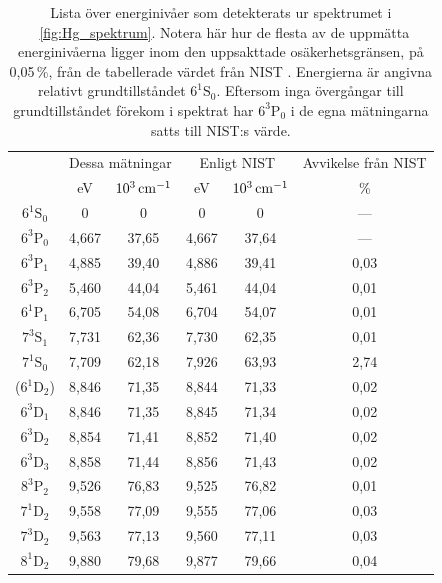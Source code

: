 \documentclass[11pt,a4paper]{article}
\newcommand{\figref}{\figurename~\ref}
\begin{document}
\begin{table}
\centering
\caption{Lista över energinivåer som detekterats ur spektrumet i
  \figref{fig:Hg_spektrum}. Notera här hur de flesta av de uppmätta
  energinivåerna ligger inom den uppsakttade osäkerhetsgränsen, på
  0,05\,\%, från de tabellerade värdet från NIST
  \cite{NIST_levels}. Energierna är angivna relativt grundtillståndet
  $6^1\mathrm{S}_0$. Eftersom inga övergångar till grundtillståndet
  förekom i spektrat har $6^3\mathrm{P}_0$ i de egna mätningarna satts
  till NIST:s värde. } 
\label{tab:Hg_nivaer}
\begin{tabular}{|c||c|c|c|c|c|}\cline{2-6}
\multicolumn{1}{c|}{} &
\multicolumn{2}{|c|}{Dessa mätningar} & 
\multicolumn{2}{|c|}{Enligt NIST\cite{NIST_levels}} 
& Avvikelse från NIST
\\ \cline{2-6}
\multicolumn{1}{c|}{} &
\unit{eV} 
& $\unit[10^3]{cm^{-1}}$ &\unit{eV} 
& $\unit[10^3]{cm^{-1}}$
& \%
\\ \hline
$6^1\mathrm{S}_0$ &0 & 0 & 0 & 0 & ---
\\ \hline
$6^3\mathrm{P}_0$ &4,667 & 37,65 & 4,667 & 37,64 & --- \\ \hline 
$6^3\mathrm{P}_1$ &4,885 & 39,40 & 4,886 & 39,41 & 0,03 \\ \hline 
$6^3\mathrm{P}_2$ &5,460 & 44,04 & 5,461 & 44,04 & 0,01 \\ \hline 
$6^1\mathrm{P}_1$ &6,705 & 54,08 & 6,704 & 54,07 & 0,01 \\ \hline 
$7^3\mathrm{S}_1$ &7,731 & 62,36 & 7,730 & 62,35 & 0,01 \\ \hline 
$7^1\mathrm{S}_0$ &7,709 & 62,18 & 7,926 & 63,93 & 2,74 \\ \hline 
($6^1\mathrm{D}_2$) &8,846 & 71,35 & 8,844 & 71,33 & 0,02 \\ \hline 
$6^3\mathrm{D}_1$ &8,846 & 71,35 & 8,845 & 71,34 & 0,02 \\ \hline 
$6^3\mathrm{D}_2$ &8,854 & 71,41 & 8,852 & 71,40 & 0,02 \\ \hline 
$6^3\mathrm{D}_3$ &8,858 & 71,44 & 8,856 & 71,43 & 0,02 \\ \hline 
$8^3\mathrm{P}_2$ &9,526 & 76,83 & 9,525 & 76,82 & 0,01 \\ \hline 
$7^1\mathrm{D}_2$ &9,558 & 77,09 & 9,555 & 77,06 & 0,03 \\ \hline 
$7^3\mathrm{D}_2$ &9,563 & 77,13 & 9,560 & 77,11 & 0,03 \\ \hline 
$8^1\mathrm{D}_2$ &9,880 & 79,68 & 9,877 & 79,66 & 0,04 \\ \hline 
\end{tabular}
\end{table}
\end{document}
